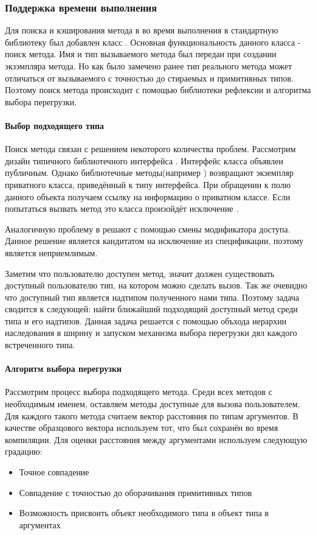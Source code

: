 \subsubsection{Поддержка времени выполнения}
Для поиска и кэширования метода в во время выполнения в стандартную библиотеку был добавлен класс . Основная функциональность данного класса - поиск метода. Имя и тип вызываемого метода был передан при создании экзэмпляра метода. Но как было замечено ранее тип реального метода может отличаться от вызываемого с точностью до стираемых и примитивных типов. Поэтому поиск метода происходит с помощью библиотеки рефлексии и алгоритма выбора перегрузки.

\paragraph{Выбор подходящего типа}
Поиск метода связан с решением некоторого количества проблем. Рассмотрим дизайн типичного библиотечного интерфейса . Интерфейс класса объявлен публичным. Однако библиотечные методы(например ) возвращают экземпляр приватного класса, приведённый к типу интерфейса. При обращении к полю  данного объекта получаем ссылку на информацию о приватном классе. Если попытаться вызвать метод это класса произойдёт исключение .

Аналогичную проблему в  решают с помощью смены модификатора доступа. Данное решение является кандитатом на исключение из спецификации, поэтому является неприемлимым.

Заметим что пользователю доступен метод, значит должен существовать доступный пользователю тип, на котором можно сделать вызов. Так же очевидно что доступный тип является надтипом полученного нами типа. Поэтому задача сводится к следующей: найти ближайший подходящий доступный метод среди типа и его надтипов. Данная задача решается с помощью объхода иерархии наследования в ширину и запуском механизма выбора перегрузки дял каждого встреченного типа.

\paragraph{Алгоритм выбора перегрузки}
Рассмотрим процесс выбора подходящего метода. Среди всех методов с необходимым именем, оставляем методы доступные для вызова пользователем. Для каждого такого метода считаем вектор расстояния по типам аргументов. В качестве образцового вектора используем тот, что был сохранён во время компиляции. Для оценки расстояния между аргументами используем следующую градацию:
\begin{itemize}
    \item Точное совпадение
    \item Совпадение с точностью до оборачивания примитивных типов
    \item Возможность присвоить объект необходимого типа в объект типа в аргументах
\end{itemize}

